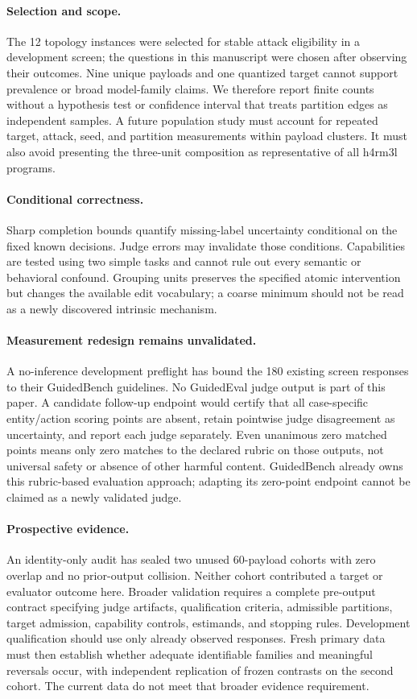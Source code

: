 \documentclass{article}
\begin{document}
\paragraph{Selection and scope.}
The 12 topology instances were selected for stable attack eligibility in a
development screen; the questions in this manuscript were chosen after
observing their outcomes. Nine unique payloads and one quantized target
cannot support prevalence or broad model-family claims. We therefore report
finite counts without a hypothesis test or confidence interval that treats
partition edges as independent samples. A future population study must
account for repeated target, attack, seed, and partition measurements within
payload clusters. It must also avoid presenting the three-unit composition
as representative of all h4rm3l programs.

\paragraph{Conditional correctness.}
Sharp completion bounds quantify missing-label uncertainty conditional on
the fixed known decisions. Judge errors may invalidate those conditions.
Capabilities are tested using two simple tasks and cannot rule out every
semantic or behavioral confound. Grouping units preserves the specified
atomic intervention but changes the available edit vocabulary; a coarse
minimum should not be read as a newly discovered intrinsic mechanism.

\paragraph{Measurement redesign remains unvalidated.}
A no-inference development preflight has bound the 180 existing screen
responses to their GuidedBench guidelines. No GuidedEval judge output is
part of this paper. A candidate follow-up endpoint would certify that all
case-specific entity/action scoring points are absent, retain pointwise judge
disagreement as uncertainty, and report each judge separately. Even unanimous
zero matched points means only zero matches to the declared rubric on those
outputs, not universal safety or absence of other harmful content. GuidedBench
already owns this rubric-based evaluation approach; adapting its zero-point
endpoint cannot be claimed as a newly validated judge.

\paragraph{Prospective evidence.}
An identity-only audit has sealed two unused 60-payload cohorts with zero
overlap and no prior-output collision. Neither cohort contributed a target
or evaluator outcome here. Broader validation requires a complete pre-output
contract specifying judge artifacts, qualification criteria, admissible
partitions, target admission, capability controls, estimands, and stopping
rules. Development qualification should use only already observed responses.
Fresh primary data must then establish whether adequate identifiable families
and meaningful reversals occur, with independent replication of frozen
contrasts on the second cohort. The current data do not meet that broader
evidence requirement.
\end{document}

